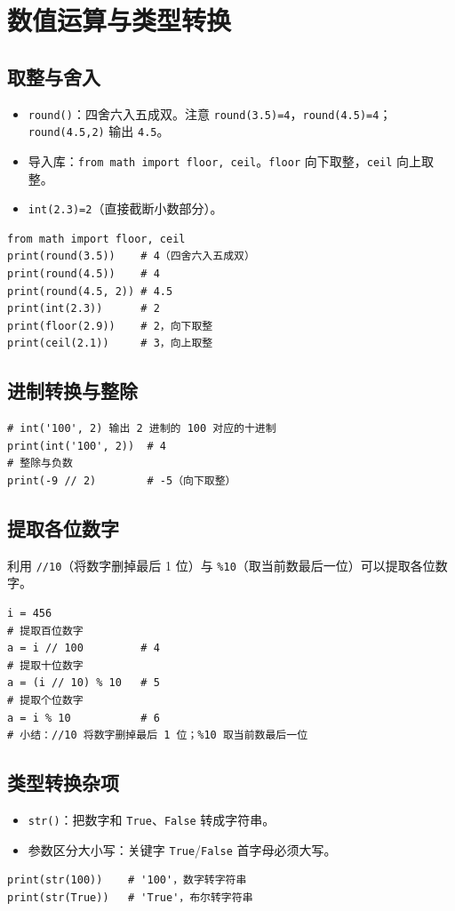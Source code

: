 \documentclass{article}
\begin{document}
\section{数值运算与类型转换}
\subsection{取整与舍入}
\begin{itemize}
	\item \texttt{round()}：四舍六入五成双。注意 \texttt{round(3.5)=4}，\texttt{round(4.5)=4}；\texttt{round(4.5,2)} 输出 \texttt{4.5}。
	\item 导入库：\texttt{from math import floor, ceil}。\texttt{floor} 向下取整，\texttt{ceil} 向上取整。
	\item \texttt{int(2.3)=2}（直接截断小数部分）。
\end{itemize}
\begin{lstlisting}
from math import floor, ceil
print(round(3.5))    # 4（四舍六入五成双）
print(round(4.5))    # 4
print(round(4.5, 2)) # 4.5
print(int(2.3))      # 2
print(floor(2.9))    # 2，向下取整
print(ceil(2.1))     # 3，向上取整
\end{lstlisting}

\subsection{进制转换与整除}
\begin{lstlisting}
# int('100', 2) 输出 2 进制的 100 对应的十进制
print(int('100', 2))  # 4
# 整除与负数
print(-9 // 2)        # -5（向下取整）
\end{lstlisting}

\subsection{提取各位数字}
利用 \texttt{//10}（将数字删掉最后 1 位）与 \texttt{\%10}（取当前数最后一位）可以提取各位数字。
\begin{lstlisting}
i = 456
# 提取百位数字
a = i // 100         # 4
# 提取十位数字
a = (i // 10) % 10   # 5
# 提取个位数字
a = i % 10           # 6
# 小结：//10 将数字删掉最后 1 位；%10 取当前数最后一位
\end{lstlisting}

\subsection{类型转换杂项}
\begin{itemize}
	\item \texttt{str()}：把数字和 \texttt{True}、\texttt{False} 转成字符串。
	\item 参数区分大小写：关键字 \texttt{True}/\texttt{False} 首字母必须大写。
\end{itemize}
\begin{lstlisting}
print(str(100))    # '100'，数字转字符串
print(str(True))   # 'True'，布尔转字符串
\end{lstlisting}
\end{document}
